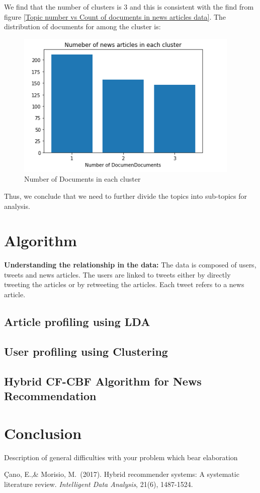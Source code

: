 \documentclass{article}
\begin{document}
We find that the number of clusters is 3 and this is consistent with the find from figure \ref{Topic number vs Count of documents in news articles data}. The distribution of documents for among the cluster  is:
\begin{figure}[H]
    \centering
    \includegraphics{cluster.PNG}
    \caption{Number of Documents in each cluster}
    \label{Number of Documents in each cluster}
\end{figure}



Thus, we conclude that we need to further divide the topics into sub-topics for analysis.


\section{Algorithm}

\textbf{Understanding the relationship in the data:} The data is composed of users, tweets and news articles. The users are linked to tweets either by directly tweeting the articles or by retweeting the articles. Each tweet refers to a news article. \\


\subsection{Article profiling using LDA}

\subsection{User profiling using Clustering}

\subsection{Hybrid CF-CBF Algorithm for News Recommendation}

\section{Conclusion}

{Description of general difficulties with your problem which bear elaboration
}

\begin{thebibliography}{9}

 Çano, E.,\& Morisio, M.\ (2017). Hybrid recommender systems: A systematic literature review. {\it Intelligent Data Analysis}, 21(6), 1487-1524.
\end{thebibliography}
\end{document}
